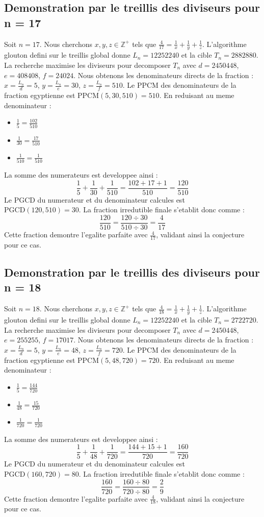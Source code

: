 \documentclass[11pt,a4paper]{article}
\begin{document}
\subsection{Demonstration par le treillis des diviseurs pour n = 17}
Soit $n = 17$. Nous cherchons $x, y, z \in \mathbb{Z}^{+}$ tels que $\frac{4}{17} = \frac{1}{x} + \frac{1}{y} + \frac{1}{z}$.
L'algorithme glouton defini sur le treillis global donne $L_n = 12252240$ et la cible $T_n = 2882880$.
La recherche maximise les diviseurs pour decomposer $T_n$ avec $d = 2450448$, $e = 408408$, $f = 24024$.
Nous obtenons les denominateurs directs de la fraction : $x = \frac{L_n}{d} = 5$, $y = \frac{L_n}{e} = 30$, $z = \frac{L_n}{f} = 510$.
Le PPCM des denominateurs de la fraction egyptienne est $\text{PPCM}(5, 30, 510) = 510$.
En reduisant au meme denominateur :
\begin{itemize}
    \item $\frac{1}{5} = \frac{102}{510}$
    \item $\frac{1}{30} = \frac{17}{510}$
    \item $\frac{1}{510} = \frac{1}{510}$
\end{itemize}
La somme des numerateurs est developpee ainsi :
$$ \frac{1}{5} + \frac{1}{30} + \frac{1}{510} = \frac{102 + 17 + 1}{510} = \frac{120}{510} $$
Le PGCD du numerateur et du denominateur calcules est $\text{PGCD}(120, 510) = 30$.
La fraction irredutible finale s'etablit donc comme :
$$ \frac{120}{510} = \frac{120 \div 30}{510 \div 30} = \frac{4}{17} $$
Cette fraction demontre l'egalite parfaite avec $\frac{4}{17}$, validant ainsi la conjecture pour ce cas.

\subsection{Demonstration par le treillis des diviseurs pour n = 18}
Soit $n = 18$. Nous cherchons $x, y, z \in \mathbb{Z}^{+}$ tels que $\frac{4}{18} = \frac{1}{x} + \frac{1}{y} + \frac{1}{z}$.
L'algorithme glouton defini sur le treillis global donne $L_n = 12252240$ et la cible $T_n = 2722720$.
La recherche maximise les diviseurs pour decomposer $T_n$ avec $d = 2450448$, $e = 255255$, $f = 17017$.
Nous obtenons les denominateurs directs de la fraction : $x = \frac{L_n}{d} = 5$, $y = \frac{L_n}{e} = 48$, $z = \frac{L_n}{f} = 720$.
Le PPCM des denominateurs de la fraction egyptienne est $\text{PPCM}(5, 48, 720) = 720$.
En reduisant au meme denominateur :
\begin{itemize}
    \item $\frac{1}{5} = \frac{144}{720}$
    \item $\frac{1}{48} = \frac{15}{720}$
    \item $\frac{1}{720} = \frac{1}{720}$
\end{itemize}
La somme des numerateurs est developpee ainsi :
$$ \frac{1}{5} + \frac{1}{48} + \frac{1}{720} = \frac{144 + 15 + 1}{720} = \frac{160}{720} $$
Le PGCD du numerateur et du denominateur calcules est $\text{PGCD}(160, 720) = 80$.
La fraction irredutible finale s'etablit donc comme :
$$ \frac{160}{720} = \frac{160 \div 80}{720 \div 80} = \frac{2}{9} $$
Cette fraction demontre l'egalite parfaite avec $\frac{4}{18}$, validant ainsi la conjecture pour ce cas.
\end{document}
